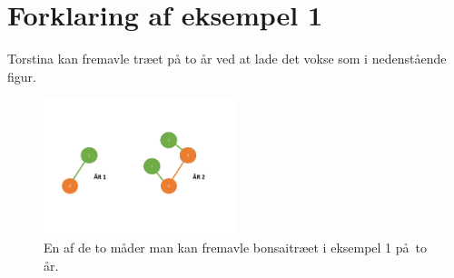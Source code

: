 \section*{Forklaring af eksempel 1}
Torstina kan fremavle træet på to år ved at lade det vokse som i nedenstående figur.

\begin{figure}[h]
	\centering
\includegraphics[width=0.5\textwidth]{Bonsai_tree}
\caption{En af de to måder man kan fremavle bonsaitræet i eksempel  1 på to år.}
\end{figure}
